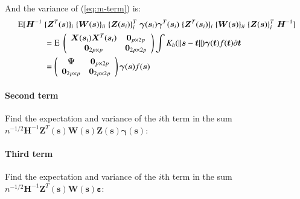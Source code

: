 \documentclass[authoryear, review, 11pt]{elsarticle}
\begin{document}
    And the variance of (\ref{eq:m-term}) is:
    \begin{align}
      \text{E} [ \bm{H}^{-1} \; &\{ \bm{Z}^T(\bm{s}) \}_i \; \{ \bm{W}(\bm{s}) \}_{ii} \; \{ \bm{Z}(\bm{s}_i) \}_i^T \; \bm{\gamma}(\bm{s}_i) \bm{\gamma}^T(\bm{s}_i) \; \{ \bm{Z}^T(\bm{s}_i) \}_i \; \{ \bm{W}(\bm{s}) \}_{ii} \; \{ \bm{Z}(\bm{s}) \}^T_i \; \bm{H}^{-1} ] \notag \\
      &= \text{E} \; \left( \begin{array}{cc} \bm{X}(\bm{s}_i) \bm{X}^T(\bm{s}_i)  & \bm{0}_{p \times 2p} \\ \bm{0}_{2p \times p} & \bm{0}_{2p \times 2p} \end{array} \right) \int K_h(\| \bm{s} - \bm{t} \|) \bm{\gamma}(\bm{t}) f(\bm{t}) \partial \bm{t} \notag \\
      &= \left( \begin{array}{cc} \bm{\Psi}  & \bm{0}_{p \times 2p} \\ \bm{0}_{2p \times p} & \bm{0}_{2p \times 2p} \end{array} \right) \bm{\gamma}(\bm{s}) f(\bm{s})
    \end{align}

  \paragraph{Second term}
    Find the expectation and variance of the $i$th term in the sum $n^{-1/2} \bm{H}^{-1} \bm{Z}^T(\bm{s}) \bm{W}(\bm{s}) \bm{Z}(\bm{s}) \bm{\gamma}(\bm{s})$:

  \paragraph{Third term}
    Find the expectation and variance of the $i$th term in the sum $n^{-1/2} \bm{H}^{-1} \bm{Z}^T(\bm{s}) \bm{W}(\bm{s}) \bm{\varepsilon}$:
\end{document}
